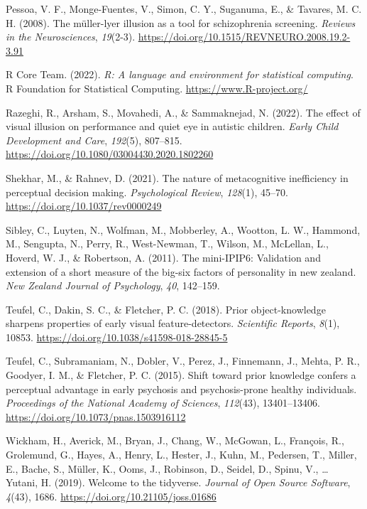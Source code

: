 \documentclass[
  man,floatsintext]{apa6}
\newlength{\cslhangindent}
\newlength{\cslentryspacingunit} %
\newenvironment{CSLReferences}[2] %
 {%
  \setlength{\parindent}{0pt}
  \ifodd #1
  \let\oldpar\par
  \def\par{\hangindent=\cslhangindent\oldpar}
  \fi
  \setlength{\parskip}{#2\cslentryspacingunit}
 }%
 {}
\begin{document}
\begin{CSLReferences}{1}{0}
\leavevmode{}%
Pessoa, V. F., Monge-Fuentes, V., Simon, C. Y., Suganuma, E., \& Tavares, M. C. H. (2008). The müller-lyer illusion as a tool for schizophrenia screening. \emph{Reviews in the Neurosciences}, \emph{19}(2-3). \url{https://doi.org/10.1515/REVNEURO.2008.19.2-3.91}

\leavevmode{}%
R Core Team. (2022). \emph{R: A language and environment for statistical computing}. R Foundation for Statistical Computing. \url{https://www.R-project.org/}

\leavevmode{}%
Razeghi, R., Arsham, S., Movahedi, A., \& Sammaknejad, N. (2022). The effect of visual illusion on performance and quiet eye in autistic children. \emph{Early Child Development and Care}, \emph{192}(5), 807--815. \url{https://doi.org/10.1080/03004430.2020.1802260}

\leavevmode{}%
Shekhar, M., \& Rahnev, D. (2021). The nature of metacognitive inefficiency in perceptual decision making. \emph{Psychological Review}, \emph{128}(1), 45--70. \url{https://doi.org/10.1037/rev0000249}

\leavevmode{}%
Sibley, C., Luyten, N., Wolfman, M., Mobberley, A., Wootton, L. W., Hammond, M., Sengupta, N., Perry, R., West-Newman, T., Wilson, M., McLellan, L., Hoverd, W. J., \& Robertson, A. (2011). The mini-IPIP6: Validation and extension of a short measure of the big-six factors of personality in new zealand. \emph{New Zealand Journal of Psychology}, \emph{40}, 142--159.

\leavevmode{}%
Teufel, C., Dakin, S. C., \& Fletcher, P. C. (2018). Prior object-knowledge sharpens properties of early visual feature-detectors. \emph{Scientific Reports}, \emph{8}(1), 10853. \url{https://doi.org/10.1038/s41598-018-28845-5}

\leavevmode{}%
Teufel, C., Subramaniam, N., Dobler, V., Perez, J., Finnemann, J., Mehta, P. R., Goodyer, I. M., \& Fletcher, P. C. (2015). Shift toward prior knowledge confers a perceptual advantage in early psychosis and psychosis-prone healthy individuals. \emph{Proceedings of the National Academy of Sciences}, \emph{112}(43), 13401--13406. \url{https://doi.org/10.1073/pnas.1503916112}

\leavevmode{}%
Wickham, H., Averick, M., Bryan, J., Chang, W., McGowan, L., François, R., Grolemund, G., Hayes, A., Henry, L., Hester, J., Kuhn, M., Pedersen, T., Miller, E., Bache, S., Müller, K., Ooms, J., Robinson, D., Seidel, D., Spinu, V., \ldots{} Yutani, H. (2019). Welcome to the tidyverse. \emph{Journal of Open Source Software}, \emph{4}(43), 1686. \url{https://doi.org/10.21105/joss.01686}


\end{CSLReferences}
\end{document}
